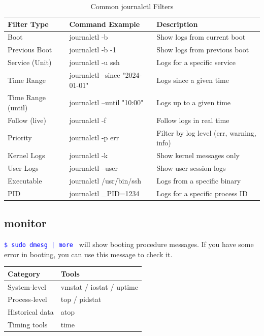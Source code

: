 \documentclass[paper=8.5in:11in, twoside, 12pt, pagesize=pdftex]{book}
\newcommand{\linuxcommand}[1]{\texttt{\textcolor{blue}{\$ #1 \Pisymbol{psy}{191}}}}
\begin{document}
\begin{table}[h]
\centering
\begin{tabular}{|l|l|l|}
\hline
\textbf{Filter Type} & \textbf{Command Example} & \textbf{Description} \\
\hline
Boot & journalctl -b & Show logs from current boot \\
\hline
Previous Boot & journalctl -b -1 & Show logs from previous boot \\
\hline
Service (Unit) & journalctl -u ssh & Logs for a specific service \\
\hline
Time Range & journalctl --since "2024-01-01" & Logs since a given time \\
\hline
Time Range (until) & journalctl --until "10:00" & Logs up to a given time \\
\hline
Follow (live) & journalctl -f & Follow logs in real time \\
\hline
Priority & journalctl -p err & Filter by log level (err, warning, info) \\
\hline
Kernel Logs & journalctl -k & Show kernel messages only \\
\hline
User Logs & journalctl --user & Show user session logs \\
\hline
Executable & journalctl /usr/bin/ssh & Logs from a specific binary \\
\hline
PID & journalctl \_PID=1234 & Logs for a specific process ID \\
\hline
\end{tabular}
\caption{Common journalctl Filters}
\end{table}

\subsection{monitor}
\linuxcommand{sudo dmesg | more} will show booting procedure messages. If you have some error in booting, you can use this message to check it. 


\begin{tabular}{|l|l|}
\hline
\textbf{Category} & \textbf{Tools} \\
\hline
System-level & vmstat / iostat / uptime \\
\hline
Process-level & top / pidstat \\
\hline
Historical data & atop \\
\hline
Timing tools & time \\
\hline
\end{tabular}
\end{document}
